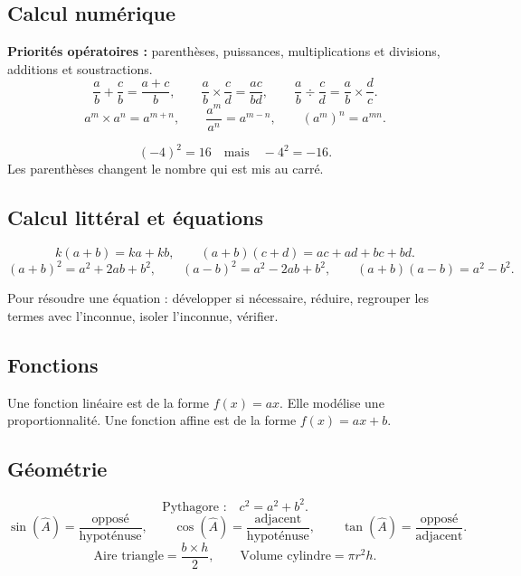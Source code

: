 \documentclass[11pt,a4paper]{article}
\begin{document}
\subsection{Calcul numérique}
\begin{retenir}
\textbf{Priorités opératoires :} parenthèses, puissances, multiplications et divisions, additions et soustractions.
\[
\frac{a}{b}+\frac{c}{b}=\frac{a+c}{b},
\qquad
\frac{a}{b}\times\frac{c}{d}=\frac{ac}{bd},
\qquad
\frac{a}{b}\div\frac{c}{d}=\frac{a}{b}\times\frac{d}{c}.
\]
\[
a^m\times a^n=a^{m+n},
\qquad
\frac{a^m}{a^n}=a^{m-n},
\qquad
(a^m)^n=a^{mn}.
\]
\end{retenir}

\begin{attention}
\[
(-4)^2=16
\quad \text{mais} \quad
-4^2=-16.
\]
Les parenthèses changent le nombre qui est mis au carré.
\end{attention}

\subsection{Calcul littéral et équations}
\begin{retenir}
\[
k(a+b)=ka+kb,
\qquad
(a+b)(c+d)=ac+ad+bc+bd.
\]
\[
(a+b)^2=a^2+2ab+b^2,
\qquad
(a-b)^2=a^2-2ab+b^2,
\qquad
(a+b)(a-b)=a^2-b^2.
\]
\end{retenir}

\begin{methode}
Pour résoudre une équation : développer si nécessaire, réduire, regrouper les termes avec l'inconnue, isoler l'inconnue, vérifier.
\end{methode}

\subsection{Fonctions}
\begin{retenir}
Une fonction linéaire est de la forme $f(x)=ax$. Elle modélise une proportionnalité. Une fonction affine est de la forme $f(x)=ax+b$.
\end{retenir}

\subsection{Géométrie}
\begin{retenir}
\[
\text{Pythagore :}\quad c^2=a^2+b^2.
\]
\[
\sin(\widehat{A})=\frac{\text{opposé}}{\text{hypoténuse}},
\qquad
\cos(\widehat{A})=\frac{\text{adjacent}}{\text{hypoténuse}},
\qquad
\tan(\widehat{A})=\frac{\text{opposé}}{\text{adjacent}}.
\]
\[
\text{Aire triangle}=\frac{b\times h}{2},
\qquad
\text{Volume cylindre}=\pi r^2h.
\]
\end{retenir}
\end{document}
